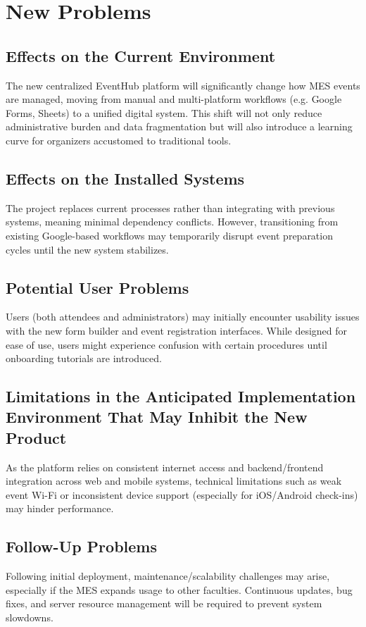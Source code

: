 \documentclass[12pt]{article}
\begin{document}
\section{New Problems}

\subsection{Effects on the Current Environment}
The new centralized EventHub platform will significantly change how MES events are managed, moving from manual and multi-platform workflows (e.g. Google Forms, Sheets) to a unified digital system. This shift will not only reduce administrative burden and data fragmentation but will also introduce a learning curve for organizers accustomed to traditional tools.

\subsection{Effects on the Installed Systems}
The project replaces current processes rather than integrating with previous systems, meaning minimal dependency conflicts. However, transitioning from existing Google-based workflows may temporarily disrupt event preparation cycles until the new system stabilizes. 

\subsection{Potential User Problems}
Users (both attendees and administrators) may initially encounter usability issues with the new form builder and event registration interfaces. While designed for ease of use, users might experience confusion with certain procedures until onboarding tutorials are introduced. 

\subsection{Limitations in the Anticipated Implementation Environment That May
Inhibit the New Product}
As the platform relies on consistent internet access and backend/frontend integration across web and mobile systems, technical limitations such as weak event Wi-Fi or inconsistent device support (especially for iOS/Android check-ins) may hinder performance. 

\subsection{Follow-Up Problems}
Following initial deployment, maintenance/scalability challenges may arise, especially if the MES expands usage to other faculties. Continuous updates, bug fixes, and server resource management will be required to prevent system slowdowns. 
\end{document}
